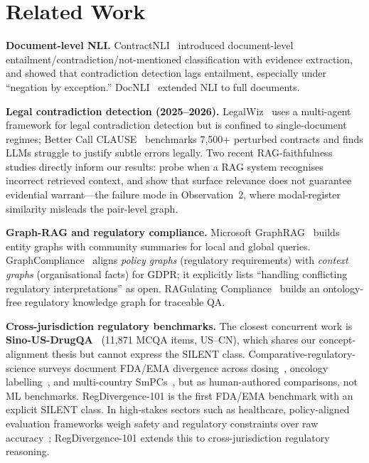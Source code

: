 \documentclass[manuscript]{acmart}
\begin{document}
\section{Related Work}

\textbf{Document-level NLI.} ContractNLI~\cite{koreeda2021contractnli} introduced
document-level entailment/contradiction/not-mentioned classification with
evidence extraction, and showed that contradiction detection lags entailment,
especially under ``negation by exception.'' DocNLI~\cite{yin2021docnli} extended
NLI to full documents.

\textbf{Legal contradiction detection (2025--2026).}
LegalWiz~\cite{legalwiz2025} uses a multi-agent framework for legal
contradiction detection but is confined to single-document regimes; Better Call
CLAUSE~\cite{betterclause2026} benchmarks 7,500+ perturbed contracts and finds
LLMs struggle to justify subtle errors legally. Two recent RAG-faithfulness
studies directly inform our results: \citet{chen2026ragwrong} probe when a RAG
system recognises incorrect retrieved context, and \citet{qian2026evidenceforce}
show that surface relevance does not guarantee evidential warrant---the failure
mode in Observation~2, where modal-register similarity misleads the
pair-level graph.

\textbf{Graph-RAG and regulatory compliance.}
Microsoft GraphRAG~\cite{edge2024graphrag} builds entity graphs with community
summaries for local and global queries. GraphCompliance~\cite{graphcompliance2025}
aligns \textit{policy graphs} (regulatory requirements) with \textit{context
graphs} (organisational facts) for GDPR; it explicitly lists ``handling
conflicting regulatory interpretations'' as open. RAGulating
Compliance~\cite{ragulating2025} builds an ontology-free regulatory knowledge
graph for traceable QA.

\textbf{Cross-jurisdiction regulatory benchmarks.}
The closest concurrent work is \textbf{Sino-US-DrugQA}~\cite{sinousdrugqa2026}
(11{,}871 MCQA items, US--CN), which shares our concept-alignment thesis but
cannot express the SILENT class. Comparative-regulatory-science surveys document
FDA/EMA divergence across dosing~\cite{mita2026doses}, oncology
labelling~\cite{gomezfernandez2026inhibitors}, and multi-country
SmPCs~\cite{pvverse2026}, but as human-authored comparisons, not ML benchmarks.
RegDivergence-101 is the first FDA/EMA benchmark with an explicit SILENT class.
In high-stakes sectors such as healthcare, policy-aligned evaluation frameworks
weigh safety and regulatory constraints over raw accuracy~\cite{chen2026dlsg};
RegDivergence-101 extends this to cross-jurisdiction regulatory reasoning.
\end{document}
